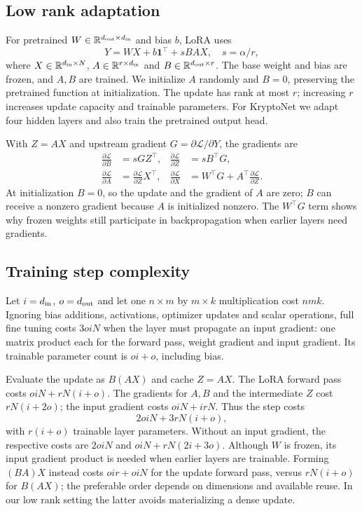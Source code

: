 \documentclass{article}
\begin{document}
\subsection{Low rank adaptation}
For pretrained $W\in\mathbb R^{d_{\rm out}\times d_{\rm in}}$ and bias $b$, LoRA \cite{hu2022} uses
\begin{equation}
Y=WX+b\mathbf1^\top+sBAX,\quad s=\alpha/r,
\label{eq:lora}
\end{equation}
where $X\in\mathbb R^{d_{\rm in}\times N}$, $A\in\mathbb R^{r\times d_{\rm in}}$ and $B\in\mathbb R^{d_{\rm out}\times r}$. The base weight and bias are frozen, and $A,B$ are trained. We initialize $A$ randomly and $B=0$, preserving the pretrained function at initialization. The update has rank at most $r$; increasing $r$ increases update capacity and trainable parameters. For KryptoNet we adapt four hidden layers and also train the pretrained output head.

With $Z=AX$ and upstream gradient $G=\partial\mathcal L/\partial Y$, the gradients are
\begin{align}
\frac{\partial\mathcal L}{\partial B}&=sGZ^\top, &
\frac{\partial\mathcal L}{\partial Z}&=sB^\top G,\\
\frac{\partial\mathcal L}{\partial A}&=\frac{\partial\mathcal L}{\partial Z}X^\top, &
\frac{\partial\mathcal L}{\partial X}&=W^\top G+A^\top\frac{\partial\mathcal L}{\partial Z}.
\end{align}
At initialization $B=0$, so the update and the gradient of $A$ are zero; $B$ can receive a nonzero gradient because $A$ is initialized nonzero. The $W^\top G$ term shows why frozen weights still participate in backpropagation when earlier layers need gradients.

\subsection{Training step complexity}
Let $i=d_{\rm in}$, $o=d_{\rm out}$ and let one $n\times m$ by $m\times k$ multiplication cost $nmk$. Ignoring bias additions, activations, optimizer updates and scalar operations, full fine tuning costs $3oiN$ when the layer must propagate an input gradient: one matrix product each for the forward pass, weight gradient and input gradient. Its trainable parameter count is $oi+o$, including bias.

Evaluate the update as $B(AX)$ and cache $Z=AX$. The LoRA forward pass costs $oiN+rN(i+o)$. The gradients for $A,B$ and the intermediate $Z$ cost $rN(i+2o)$; the input gradient costs $oiN+irN$. Thus the step costs
\begin{equation}
2oiN+3rN(i+o),
\label{eq:cost}
\end{equation}
with $r(i+o)$ trainable layer parameters. Without an input gradient, the respective costs are $2oiN$ and $oiN+rN(2i+3o)$. Although $W$ is frozen, its input gradient product is needed when earlier layers are trainable. Forming $(BA)X$ instead costs $oir+oiN$ for the update forward pass, versus $rN(i+o)$ for $B(AX)$; the preferable order depends on dimensions and available reuse. In our low rank setting the latter avoids materializing a dense update.
\end{document}
